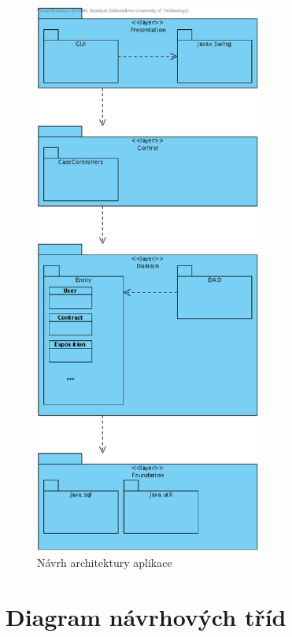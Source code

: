 \begin{figure}[H]
	\begin{center}
		\includegraphics[width=7.5cm,keepaspectratio]{include/architecture}
	\end{center}
	\caption{Návrh architektury aplikace}
	\label{fig:Architecture}
\end{figure}

\pagebreak

\section*{Diagram návrhových tříd}

